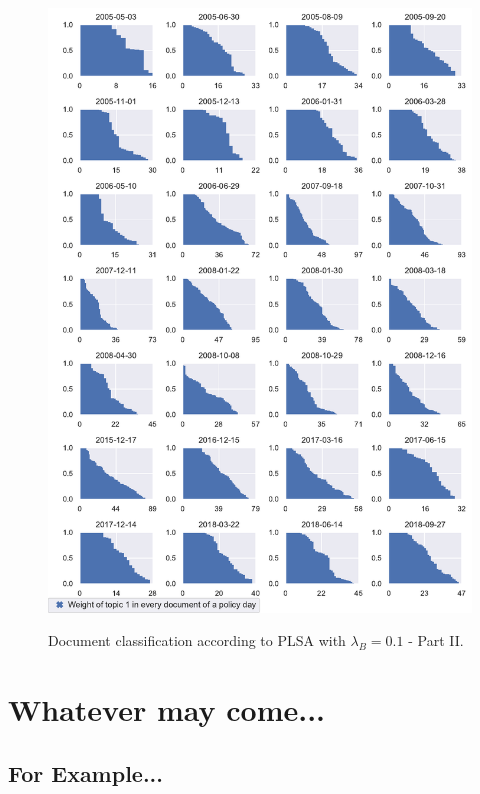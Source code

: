 \documentclass[11pt,a4paper,english,oneside]{book}
\numberwithin{equation}{chapter}
\begin{document}
\begin{figure}
	\caption{Document classification according to PLSA with $\lambda_B = 0.1$ - Part II.}
	\centering
	\includegraphics[scale=0.8]{Images/docsplit02_bgLamb_0_1.pdf}
	\label{classdoc02L01}
\end{figure}

\renewcommand{\theequation}{C.\arabic{equation}}


\chapter{Whatever may come...}



\section{For Example... }
\end{document}
